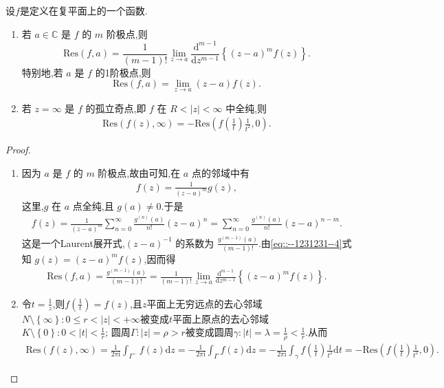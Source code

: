\documentclass[../../main.tex]{subfiles}%
\begin{document}
\begin{proposition}\label{proposition:命题5.4.2}
设$f$是定义在复平面上的一个函数.
\begin{enumerate}[(1)]
\item 若 \( a\in \mathbb{C} \) 是 \( f \) 的 \( m \) 阶极点,则
\[
\mathrm{Res}(f,a) = \frac{1}{(m - 1)!} \lim_{z \to a} \frac{\mathrm{d}^{m - 1}}{\mathrm{d}z^{m - 1}} \left\{ (z - a)^m f(z) \right\}.
\]
特别地,若 \( a \) 是 \( f \) 的1阶极点,则
\[
\mathrm{Res}(f,a) = \lim_{z \to a} (z - a) f(z).
\]

\item 若 \( z = \infty \) 是 \( f \) 的孤立奇点,即 \( f \) 在 \( R < |z| < \infty \) 中全纯,则
\begin{align*}
\mathrm{Res}\left( f\left( z \right) ,\infty \right) =-\mathrm{Res}\left( f\left( \frac{1}{t} \right) \frac{1}{t^2},0 \right) .
\end{align*}
\end{enumerate}
\end{proposition}
\begin{proof}
\begin{enumerate}[(1)]
\item 因为 \( a \) 是 \( f \) 的 \( m \) 阶极点,故由可知,在 \( a \) 点的邻域中有
\begin{align}
f(z) = \frac{1}{(z - a)^m} g(z), 
\label{eq::--1231231--4}
\end{align}
这里,\( g \) 在 \( a \) 点全纯,且 \( g(a) \neq 0 \).于是
\begin{align*}
f(z) = \frac{1}{(z - a)^m} \sum_{n = 0}^{\infty} \frac{g^{(n)}(a)}{n!} (z - a)^n = \sum_{n = 0}^{\infty} \frac{g^{(n)}(a)}{n!} (z - a)^{n - m}.
\end{align*}
这是一个Laurent展开式,\( (z - a)^{-1} \) 的系数为 \( \frac{g^{(m - 1)}(a)}{(m - 1)!} \).由\eqref{eq::--1231231--4}式知 \( g(z) = (z - a)^m f(z) \),因而得
\begin{align*}
\mathrm{Res}(f,a) = \frac{g^{(m - 1)}(a)}{(m - 1)!} = \frac{1}{(m - 1)!} \lim_{z \to a} \frac{\mathrm{d}^{m - 1}}{\mathrm{d}z^{m - 1}} \left\{ (z - a)^m f(z) \right\}.
\end{align*}

\item 令$t=\frac{1}{z}$,则$f\left( \frac{1}{t} \right) =f\left( z \right)$,且$z$平面上无穷远点的去心邻域$N\setminus \left\{ \infty \right\} :0\leqslant r<\left| z \right|<+\infty$被变成$t$平面上原点的去心邻域$K\setminus \left\{ 0 \right\} :0<\left| t \right|<\frac{1}{r}$;
圆周$\Gamma :\left| z \right|=\rho >r$被变成圆周$\gamma :\left| t \right|=\lambda =\frac{1}{\rho}<\frac{1}{r}$.从而
\begin{align*}
\mathrm{Res}\left( f\left( z \right) ,\infty \right) =\frac{1}{2\pi \mathrm{i}}\int_{\Gamma ^-}{f\left( z \right) \mathrm{d}z}=-\frac{1}{2\pi \mathrm{i}}\int_{\Gamma}{f\left( z \right) \mathrm{d}z}
=-\frac{1}{2\pi \mathrm{i}}\int_{\gamma}{f\left( \frac{1}{t} \right) \frac{1}{t^2}\mathrm{d}t}=-\mathrm{Res}\left( f\left( \frac{1}{t} \right) \frac{1}{t^2},0 \right).
\end{align*}
\end{enumerate}
\end{proof}
\end{document}
